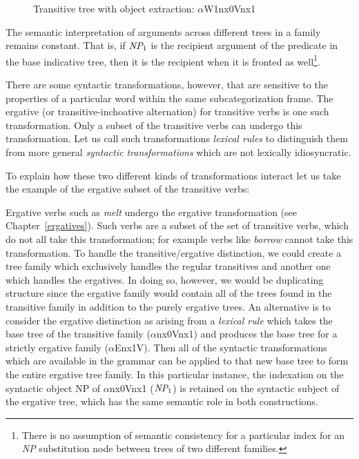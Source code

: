 \begin{figure}[htb]
\centering
\mbox{}
\caption{Transitive tree with object extraction: $\alpha$W1nx0Vnx1}
\label{trans-extracted-tree}
\end{figure} 

The semantic interpretation of arguments across different trees in a
family remains constant.  That is, if $\mbox{\em NP}_1$ is the
recipient argument of the predicate in the base indicative tree, then
it is the recipient when it is fronted as well\footnote{ There is no
assumption of semantic consistency for a particular index for an {\em
NP} substitution node between trees of two different families.}.

There are some syntactic transformations, however, that are sensitive
to the properties of a particular word within the same
subcategorization frame. The ergative (or transitive-inchoative
alternation) for transitive verbs is one such transformation. Only a
subset of the transitive verbs can undergo this transformation. Let us
call such transformations {\em lexical rules} to distinguish them
from more general {\em syntactic transformations} which are not
lexically idiosyncratic.

To explain how these two different kinds of transformations interact
let us take the example of the ergative subset of the transitive
verbs:

Ergative verbs such as {\it melt} undergo the ergative transformation (see
Chapter~\ref{ergatives}). Such verbs are a subset of the set of transitive
verbs, which do not all take this transformation; for example verbs like {\it
borrow} cannot take this transformation. To handle the transitive/ergative
distinction, we could create a tree family which exclusively handles the
regular transitives and another one which handles the ergatives.  In doing so,
however, we would be duplicating structure since the ergative family would
contain all of the trees found in the transitive family in addition to the
purely ergative trees.  An alternative is to consider the ergative distinction
as arising from a {\em lexical rule} which takes the base tree of the
transitive family ($\alpha$nx0Vnx1) and produces the base tree for a strictly
ergative family ($\alpha$Enx1V).  Then all of the syntactic transformations
which are available in the grammar can be applied to that new base tree to form
the entire ergative tree family.  In this particular instance, the indexation
on the syntactic object NP of $\alpha$nx0Vnx1 ($\mbox{\em NP}_1$) is retained
on the syntactic subject of the ergative tree, which has the same semantic role
in both constructions.

